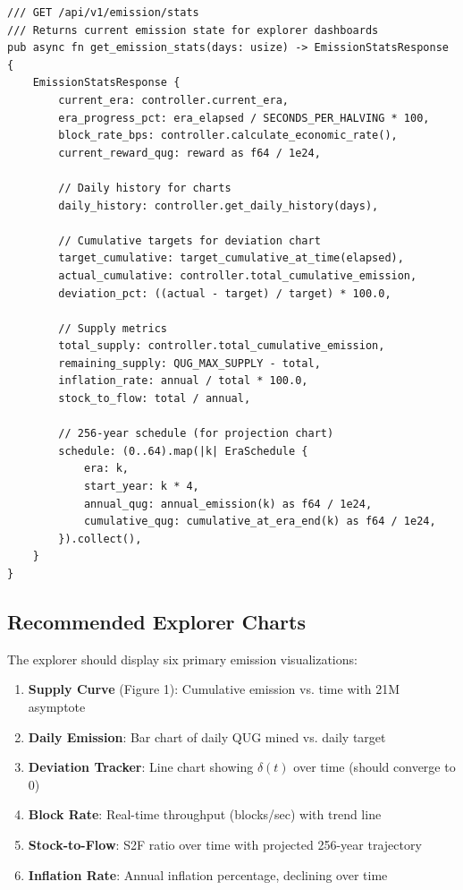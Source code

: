 \documentclass[11pt,a4paper]{article}
\begin{document}
\begin{lstlisting}[style=rust,caption={Emission Statistics API (Rust)}]
/// GET /api/v1/emission/stats
/// Returns current emission state for explorer dashboards
pub async fn get_emission_stats(days: usize) -> EmissionStatsResponse {
    EmissionStatsResponse {
        current_era: controller.current_era,
        era_progress_pct: era_elapsed / SECONDS_PER_HALVING * 100,
        block_rate_bps: controller.calculate_economic_rate(),
        current_reward_qug: reward as f64 / 1e24,

        // Daily history for charts
        daily_history: controller.get_daily_history(days),

        // Cumulative targets for deviation chart
        target_cumulative: target_cumulative_at_time(elapsed),
        actual_cumulative: controller.total_cumulative_emission,
        deviation_pct: ((actual - target) / target) * 100.0,

        // Supply metrics
        total_supply: controller.total_cumulative_emission,
        remaining_supply: QUG_MAX_SUPPLY - total,
        inflation_rate: annual / total * 100.0,
        stock_to_flow: total / annual,

        // 256-year schedule (for projection chart)
        schedule: (0..64).map(|k| EraSchedule {
            era: k,
            start_year: k * 4,
            annual_qug: annual_emission(k) as f64 / 1e24,
            cumulative_qug: cumulative_at_era_end(k) as f64 / 1e24,
        }).collect(),
    }
}
\end{lstlisting}

\subsection{Recommended Explorer Charts}

The explorer should display six primary emission visualizations:

\begin{enumerate}
    \item \textbf{Supply Curve} (Figure 1): Cumulative emission vs. time with 21M asymptote
    \item \textbf{Daily Emission}: Bar chart of daily QUG mined vs. daily target
    \item \textbf{Deviation Tracker}: Line chart showing $\delta(t)$ over time (should converge to 0)
    \item \textbf{Block Rate}: Real-time throughput (blocks/sec) with trend line
    \item \textbf{Stock-to-Flow}: S2F ratio over time with projected 256-year trajectory
    \item \textbf{Inflation Rate}: Annual inflation percentage, declining over time
\end{enumerate}
\end{document}
